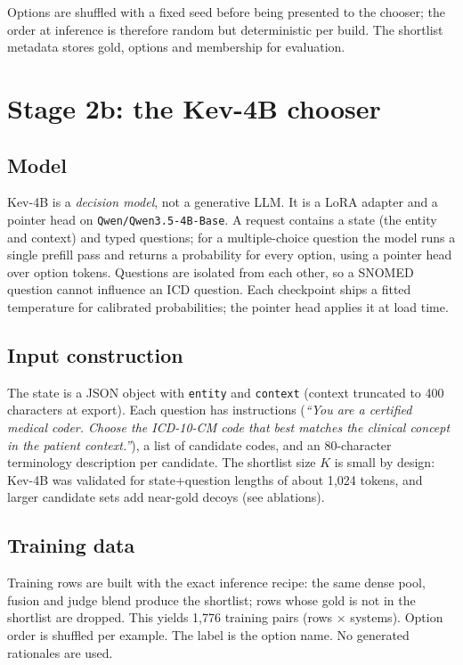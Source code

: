 \documentclass[11pt]{article}
\newcommand{\code}[1]{\texttt{#1}}
\begin{document}
Options are shuffled with a fixed seed before being presented to the chooser; the order at
inference is therefore random but deterministic per build. The shortlist metadata stores
gold, options and membership for evaluation.

\section{Stage 2b: the Kev-4B chooser}
\subsection{Model}
Kev-4B is a \emph{decision model}, not a generative LLM. It is a LoRA adapter and a pointer
head on \code{Qwen/Qwen3.5-4B-Base}. A request contains a state (the entity and context) and
typed questions; for a multiple-choice question the model runs a single prefill pass and
returns a probability for every option, using a pointer head over option tokens. Questions
are isolated from each other, so a SNOMED question cannot influence an ICD question. Each
checkpoint ships a fitted temperature for calibrated probabilities; the pointer head applies
it at load time.

\subsection{Input construction}
The state is a JSON object with \code{entity} and \code{context} (context truncated to
400 characters at export). Each question has instructions (\emph{``You are a certified
medical coder. Choose the ICD-10-CM code that best matches the clinical concept in the
patient context.''}), a list of candidate codes, and an 80-character terminology description
per candidate. The shortlist size $K$ is small by design: Kev-4B was validated for
state+question lengths of about 1{,}024 tokens, and larger candidate sets add near-gold
decoys (see ablations).

\subsection{Training data}
Training rows are built with the exact inference recipe: the same dense pool, fusion and
judge blend produce the shortlist; rows whose gold is not in the shortlist are dropped.
This yields 1{,}776 training pairs (rows $\times$ systems). Option order is shuffled per
example. The label is the option name. No generated rationales are used.
\end{document}
